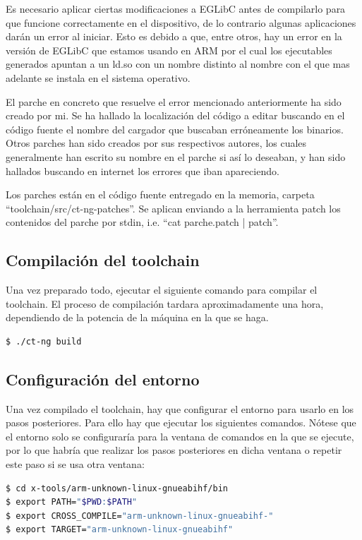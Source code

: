 \documentclass{tfg}
\begin{document}
Es necesario aplicar ciertas modificaciones a EGLibC antes de compilarlo para que funcione correctamente en el
dispositivo, de lo contrario algunas aplicaciones darán un error al iniciar. Esto es debido a que, entre otros, hay un error en la versión de EGLibC que estamos usando en ARM por el cual los ejecutables generados apuntan a un ld.so con un nombre distinto al nombre con el que mas adelante se instala en el sistema operativo.

El parche en concreto que resuelve el error mencionado anteriormente ha sido creado por mi. Se ha hallado la localización del código a editar buscando en el código fuente el nombre del cargador que buscaban erróneamente los binarios. Otros parches han sido creados por sus respectivos autores, los cuales generalmente han escrito su nombre en el parche si así lo deseaban, y han sido hallados buscando en internet los errores que iban apareciendo.

Los parches están en el código fuente entregado en la memoria, carpeta ``toolchain/src/ct-ng-patches''. Se aplican enviando a la herramienta patch los contenidos del parche por stdin, i.e. ``cat parche.patch | patch''.

\subsection{Compilación del toolchain}
Una vez preparado todo, ejecutar el siguiente comando para compilar el toolchain. El proceso de compilación tardara
aproximadamente una hora, dependiendo de la potencia de la máquina en la que se haga.
\begin{lstlisting}[language=bash,caption=Compilacion del toolchain]
$ ./ct-ng build
\end{lstlisting}
%

\subsection{Configuración del entorno}
Una vez compilado el toolchain, hay que configurar el entorno para usarlo en los pasos posteriores. Para ello hay
que ejecutar los siguientes comandos. Nótese que el entorno solo se configuraría para la ventana de comandos en la que
se ejecute, por lo que habría que realizar los pasos posteriores en dicha ventana o repetir este paso si se usa
otra ventana:
\begin{lstlisting}[language=bash,caption=Configuración del entorno]
$ cd x-tools/arm-unknown-linux-gnueabihf/bin
$ export PATH="$PWD:$PATH"
$ export CROSS_COMPILE="arm-unknown-linux-gnueabihf-"
$ export TARGET="arm-unknown-linux-gnueabihf"
\end{lstlisting}
\end{document}
